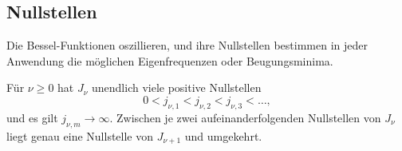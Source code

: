 %
%
\subsection{Nullstellen
\label{bessel:eigenschaften:subsection:nullstellen}}
Die Bessel-Funktionen oszillieren, und ihre Nullstellen bestimmen in jeder Anwendung die möglichen Eigenfrequenzen oder Beugungsminima.
 
\begin{satz}
\label{bessel:eigenschaften:satz:nullstellen}
Für $\nu\ge 0$ hat $J_\nu$ unendlich viele positive Nullstellen
\[
0 < j_{\nu,1} < j_{\nu,2} < j_{\nu,3} < \dots,
\]
und es gilt $j_{\nu,m}\to\infty$.
Zwischen je zwei aufeinanderfolgenden Nullstellen von $J_\nu$ liegt genau eine Nullstelle von $J_{\nu+1}$ und umgekehrt.
\end{satz}


